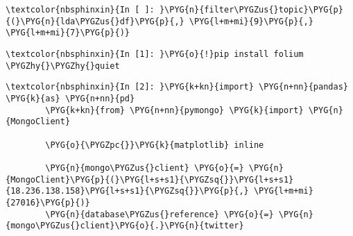 \documentclass[letterpaper,10pt,english]{sphinxmanual}
\begin{document}
%
\begin{Verbatim}[commandchars=\\\{\}]
\textcolor{nbsphinxin}{In [ ]: }\PYG{n}{filter\PYGZus{}topic}\PYG{p}{(}\PYG{n}{lda\PYGZus{}df}\PYG{p}{,} \PYG{l+m+mi}{9}\PYG{p}{,} \PYG{l+m+mi}{7}\PYG{p}{)}
\end{Verbatim}

%
\begin{Verbatim}[commandchars=\\\{\}]
\textcolor{nbsphinxin}{In [1]: }\PYG{o}{!}pip install folium \PYGZhy{}\PYGZhy{}quiet
\end{Verbatim}

%
\begin{Verbatim}[commandchars=\\\{\}]
\textcolor{nbsphinxin}{In [2]: }\PYG{k+kn}{import} \PYG{n+nn}{pandas} \PYG{k}{as} \PYG{n+nn}{pd}
        \PYG{k+kn}{from} \PYG{n+nn}{pymongo} \PYG{k}{import} \PYG{n}{MongoClient}
        
        \PYG{o}{\PYGZpc{}}\PYG{k}{matplotlib} inline
        
        \PYG{n}{mongo\PYGZus{}client} \PYG{o}{=} \PYG{n}{MongoClient}\PYG{p}{(}\PYG{l+s+s1}{\PYGZsq{}}\PYG{l+s+s1}{18.236.138.158}\PYG{l+s+s1}{\PYGZsq{}}\PYG{p}{,} \PYG{l+m+mi}{27016}\PYG{p}{)}
        \PYG{n}{database\PYGZus{}reference} \PYG{o}{=} \PYG{n}{mongo\PYGZus{}client}\PYG{o}{.}\PYG{n}{twitter}
\end{Verbatim}
\end{document}

